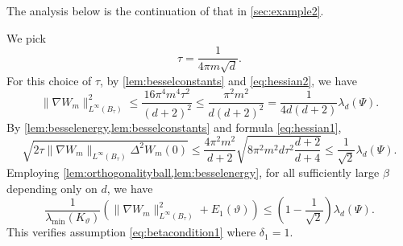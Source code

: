 \documentclass[11pt]{article}
\theoremstyle{definition}
\numberwithin{theorem}{section}
\numberwithin{lemma}{section}
\numberwithin{equation}{section}
\def\T{\mathbb{T}}
\renewcommand{\subset}{\subseteq}
\numberwithin{equation}{section}
\begin{document}
	The analysis below is the continuation of that in \cref{sec:example2}.
	

	
		
	We pick 
		$$
		\tau= \frac{1}{4\pi m \sqrt d}.
		$$
		For this choice of $\tau$, by \cref{lem:besselconstants} and \eqref{eq:hessian2}, we have 
		$$
		\|\nabla W_m\|_{L^\infty(B_\tau)}^2
		\leq \frac{16\pi^4 m^4 \tau^2}{(d+2)^2}
		\leq \frac{\pi^2 m^2}{d(d+2)^2}
		= \frac{1}{4 d(d+2)}\lambda_d(\Psi) .
		$$ 
		By \cref{lem:besselenergy,lem:besselconstants} and formula \eqref{eq:hessian1},  
		$$
		\sqrt{2 \tau \|\nabla W_m\|_{L^\infty(B_\tau)} \Delta^2 W_m(0)} 
		\leq \frac{4\pi^2 m^2}{d+2} \sqrt{8\pi^2 m^2 d\tau^2 \frac{d+2}{d+4}} 
		\leq \frac 1{\sqrt2} \lambda_d(\Psi).
		$$
		Employing \cref{lem:orthogonalityball,lem:besselenergy}, for all sufficiently large $\beta$ depending only on $d$, we have 
		$$
		\frac{1}{\lambda_{\min}(K_\vartheta)} \left(\|\nabla W_m\|_{L^\infty(B_\tau)}^2 + E_1(\vartheta) \right)
		\leq \left(1-\frac 1{\sqrt2}\right) \lambda_d(\Psi).
		$$
		This verifies assumption \eqref{eq:betacondition1} where $\delta_1=1$. 
		
\end{document}
